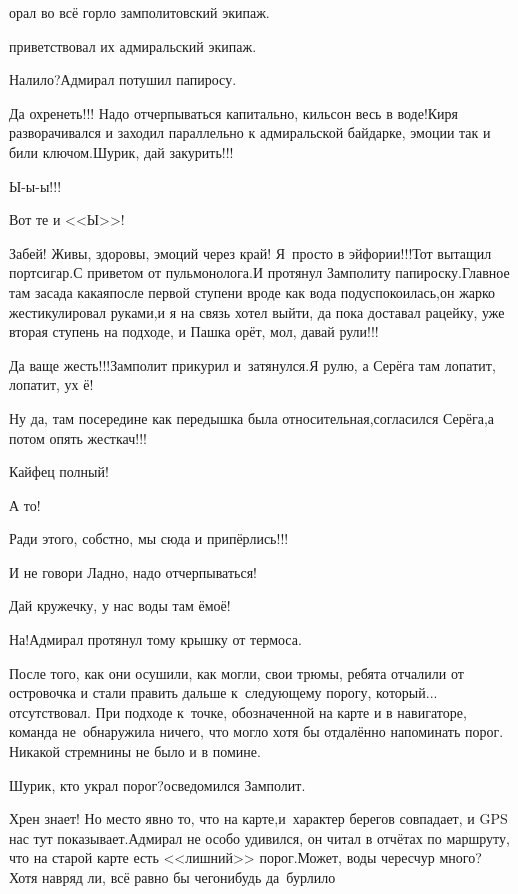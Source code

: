 \mdash орал во всё горло замполитовский экипаж.

\mdash приветствовал их адмиральский экипаж.

\diagdash Налило?\mdash Адмирал потушил папиросу.

\diagdash Да охренеть!!! Надо отчерпываться капитально, кильсон весь в воде!\mdash Киря разворачивался и заходил параллельно к адмиральской байдарке, эмоции так и били ключом.\mdash Шурик, дай закурить!!!

\diagdash Ы-ы-ы!!!

\diagdash Вот те и <<Ы>>!

\diagdash Забей! Живы, здоровы, эмоций через край! Я~просто в эйфории!!!\mdash Тот вытащил портсигар.\mdash С приветом от пульмонолога.\mdash И протянул Замполиту папироску.\mdash Главное там засада какая\mdash после первой ступени вроде как вода подуспокоилась,\mdash он жарко жестикулировал руками,\mdash и я на связь хотел выйти, да пока доставал рацейку, уже вторая ступень на подходе, и Пашка орёт, мол, давай рули!!!

\diagdash Да ваще жесть!!!\mdash Замполит прикурил и~затянулся.\mdash Я рулю, а Серёга там лопатит, лопатит, ух ё!

\diagdash Ну да, там посередине как передышка была относительная,\mdash согласился Серёга,\mdash а потом опять жесткач!!!

\diagdash Кайфец полный!

\diagdash А то!

\diagdash Ради этого, собстно, мы сюда и припёрлись!!!

\diagdash И не говори\myldots{} Ладно, надо отчерпываться!

\diagdash Дай кружечку, у нас воды там ё\sdash моё!

\diagdash На!\mdash Адмирал протянул тому крышку от термоса.

После того, как они осушили, как могли, свои трюмы, ребята отчалили от островочка и стали править дальше к~следующему порогу, который... отсутствовал. При подходе к~точке, обозначенной на карте и в навигаторе, команда не~обнаружила ничего, что могло хотя бы отдалённо напоминать порог. Никакой стремнины не было и в помине.

\diagdash Шурик, кто украл порог?\mdash осведомился Замполит. 

\diagdash Хрен знает! Но место явно то, что на карте,\mdash и~характер берегов совпадает, и GPS нас тут показывает.\mdash Адмирал не особо удивился, он читал в отчётах по маршруту, что на старой карте есть <<лишний>> порог.\mdash Может, воды чересчур много? Хотя навряд ли, всё равно бы чего\sdash нибудь да~бурлило\myldots{}

